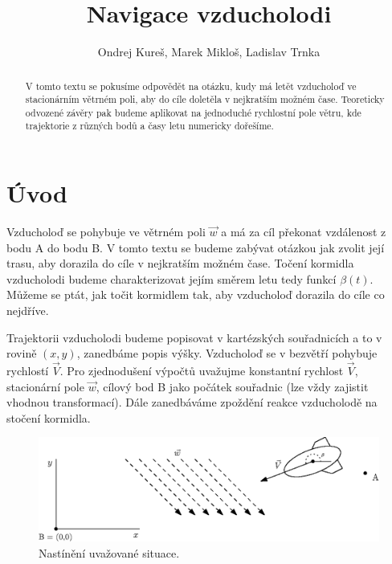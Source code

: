 \documentclass[reqno, a4paper]{amsart}
\title[Matematické kyvadlo]{Navigace vzducholodi}
\author{Ondrej Kureš, Marek Mikloš, Ladislav Trnka}
\numberwithin{equation}{section}
\begin{document}
\begin{abstract}
V tomto textu se pokusíme odpovědět na otázku, kudy má letět vzducholoď ve stacionárním větrném poli, aby do cíle doletěla v nejkratším možném čase. Teoreticky odvozené závěry pak budeme aplikovat na jednoduché rychlostní pole větru, kde trajektorie z různých bodů a časy letu numericky dořešíme.
\end{abstract}

\maketitle

\tableofcontents



\section{Úvod}
\label{sec:Úvod}

Vzducholoď se pohybuje ve větrném poli $\vec{w}$ a má za cíl překonat vzdálenost z bodu A do bodu B. V tomto textu se budeme zabývat otázkou jak zvolit její trasu, aby dorazila do cíle v nejkratším možném čase. Točení kormidla vzducholodi budeme charakterizovat jejím směrem letu tedy funkcí $\beta (t)$. Můžeme se ptát, jak točit kormidlem tak, aby vzducholoď dorazila do cíle co nejdříve. 

Trajektorii vzducholodi budeme popisovat v kartézských souřadnicích a to v rovině $(x,y)$, zanedbáme popis výšky. Vzducholoď se v bezvětří pohybuje rychlostí $\vec{V}$. Pro zjednodušení výpočtů uvažujme konstantní rychlost $\vec{V}$, stacionární pole $\vec{w}$, cílový bod B jako počátek souřadnic (lze vždy zajistit vhodnou transformací). Dále zanedbáváme zpoždění reakce vzducholodě na stočení kormidla.

\begin{figure}[h!]
  \centering
  \includegraphics[width=15cm]{figures/airship.eps}
  \caption{Nastínění uvažované situace.}
  \label{Rplot1-2}
\end{figure}
\end{document}
